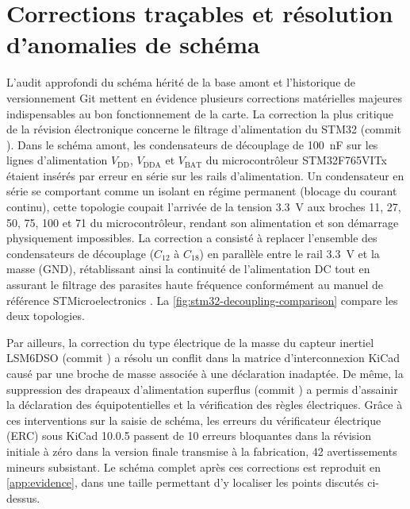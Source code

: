 \section{Corrections traçables et résolution d'anomalies de schéma}

L'audit approfondi du schéma hérité de la base amont et l'historique de versionnement Git mettent en évidence plusieurs corrections matérielles majeures indispensables au bon fonctionnement de la carte. La correction la plus critique de la révision électronique concerne le filtrage d'alimentation du STM32 (commit ). Dans le schéma amont, les condensateurs de découplage de \SI{100}{\nano\farad} sur les lignes d'alimentation $V_{\mathrm{DD}}$, $V_{\mathrm{DDA}}$ et $V_{\mathrm{BAT}}$ du microcontrôleur STM32F765VITx étaient insérés par erreur en série sur les rails d'alimentation. Un condensateur en série se comportant comme un isolant en régime permanent (blocage du courant continu), cette topologie coupait l'arrivée de la tension \SI{3.3}{\volt} aux broches 11, 27, 50, 75, 100 et 71 du microcontrôleur, rendant son alimentation et son démarrage physiquement impossibles. La correction a consisté à replacer l'ensemble des condensateurs de découplage ($C_{12}$ à $C_{18}$) en parallèle entre le rail \SI{3.3}{\volt} et la masse (GND), rétablissant ainsi la continuité de l'alimentation DC tout en assurant le filtrage des parasites haute fréquence conformément au manuel de référence STMicroelectronics \cite{stmicro-stm32f765}. La \cref{fig:stm32-decoupling-comparison} compare les deux topologies.

Par ailleurs, la correction du type électrique de la masse du capteur inertiel LSM6DSO (commit ) a résolu un conflit dans la matrice d'interconnexion KiCad causé par une broche de masse associée à une déclaration inadaptée. De même, la suppression des drapeaux d'alimentation superflus (commit ) a permis d'assainir la déclaration des équipotentielles et la vérification des règles électriques. Grâce à ces interventions sur la saisie de schéma, les erreurs du vérificateur électrique (ERC) sous KiCad 10.0.5 passent de 10 erreurs bloquantes dans la révision initiale à zéro dans la version finale transmise à la fabrication, 42 avertissements mineurs subsistant. Le schéma complet après ces corrections est reproduit en \cref{app:evidence}, dans une taille permettant d'y localiser les points discutés ci-dessus.

